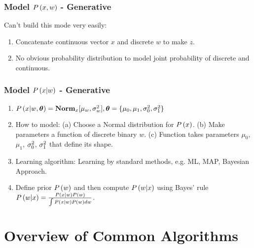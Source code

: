 \subsubsection*{Model $\P{x,w}$ - Generative}
Can't build this mode very easily:
	\begin{enumerate}
		\item Concatenate continuous vector $x$ and discrete $w$ to make $z$.
		\item No obvious probability distribution to model joint probability of discrete and continuous.
	\end{enumerate}

\subsubsection*{Model $\P{x|w}$ - Generative}
	\begin{enumerate}
		\item $\P{x|w,\vec{\th}}=\Norm_x[\mu_w,\si_w^2], \vec{\th}=\{\mu_0,\mu_1,\si_0^2,\si_1^2\}$
		\item How to model: (a) Choose a Normal distribution for $\P{x}$. (b) Make parameters a function of discrete binary $w$. (c) Function takes parameters $\mu_0$, $\mu_1$, $\si_0^2$, $\si_1^2$ that define its shape. 
		\item Learning algorithm: Learning by standard methods, e.g. ML, MAP, Bayesian Approach.
		\item Define prior $\P{w}$ and then compute $\P{w|x}$ using Bayes' rule $\P{w|x}=\frac{\P{x|w}\P{w}}{\int\P{x|w}\P{w}dw}$.
	\end{enumerate}

\section{Overview of Common Algorithms}

